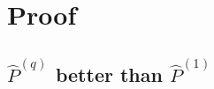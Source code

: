 \documentclass[a4paper]{article}
\begin{document}









\section{Proof}

\subsection{$\hat{P}^{(q)}$ better than $\hat{P}^{(1)}$}
\end{document}
